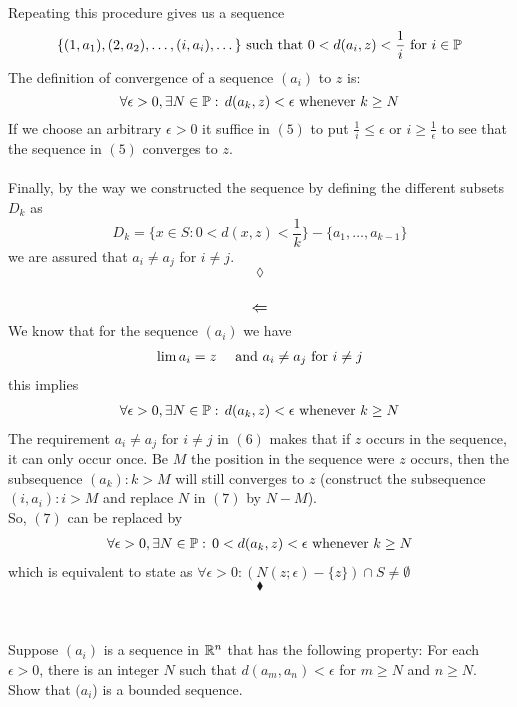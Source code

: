  Repeating this procedure gives us a sequence
  \begin{align}
 \{(1,a_1), (2,a_2),\dots, (i,a_i),\dots\}\text{ such that }0< d(a_i,z)<\frac{1}{i}\text{ for } i\in \mathbb{P} 
 \end{align}
The definition of convergence of a sequence $(a_i)$ to $z$  is:
$$\forall\epsilon > 0, \exists N\in\mathbb{P}:\, d(a_k,z) <\epsilon \text{ whenever } k \geq N $$
If we choose an arbitrary $\epsilon>0$ it suffice in $(5)$ to put $\frac{1}{i}\leq \epsilon$ or $i\geq \frac{1}{\epsilon}$ to see that the sequence in $(5)$ converges to $z$.\\\\
Finally, by the way we constructed  the sequence by defining the different subsets $D_k$ as $$D_k=\{ x\in S: 0<d(x,z)<\frac{1}{k}\}-\{a_1,\dots,a_{k-1}\}  $$ we are assured that $a_i\neq a_j$ for $i\neq j$.
$$\lozenge$$\\
$$\mathbf{\mathlarger{\Leftarrow}}$$
We know that for the sequence $(a_i)$ we have 
\begin{align}
\lim a_i= z\quad\text{ and } a_i\neq a_j \text{ for } i\neq j
\end{align}
this implies
\begin{align}
\forall\epsilon > 0, \exists N\in\mathbb{P}:\, d(a_k,z) <\epsilon \text{ whenever } k \geq N
\end{align}
The requirement $a_i\neq a_j \text{ for } i\neq j$ in $(6)$ makes that if $z$ occurs in the sequence, it can only occur once. Be $M$ the position in the sequence were $z$ occurs, then the subsequence $(a_k):k> M$ will still converges to $z$ (construct the subsequence $(i,a_i): i>M$ and replace $N$ in $(7)$ by $N-M$).\\
So, $(7)$ can be replaced by 
\begin{align}
\forall\epsilon > 0, \exists N\in\mathbb{P}:\, 0< d(a_k,z) <\epsilon \text{ whenever } k \geq N
\end{align}
which is equivalent to state as 
$\forall \epsilon >0: \left(N(z;\epsilon)-\{z\}\right)\cap S\neq\emptyset$
$$\blacklozenge$$\\


\subsection{}
\begin{tcolorbox}
 Suppose $(a_i)$ is a sequence in $\mathbb{R}^n$ that has the following property:
For each $\epsilon > 0$, there is an integer $N$ such that $d(a_m, a_n) < \epsilon$
for $m\geq N $ and $n\geq N$. Show that $(a_i$) is a bounded sequence.
\end{tcolorbox}

